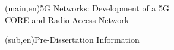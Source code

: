
%




%
%
%
%
\nttitle(main,en){5G Networks: Development of a 5G\\CORE and Radio Access Network}%

\nttitle(sub,en){Pre-Dissertation Information}%



%
%
%
%



